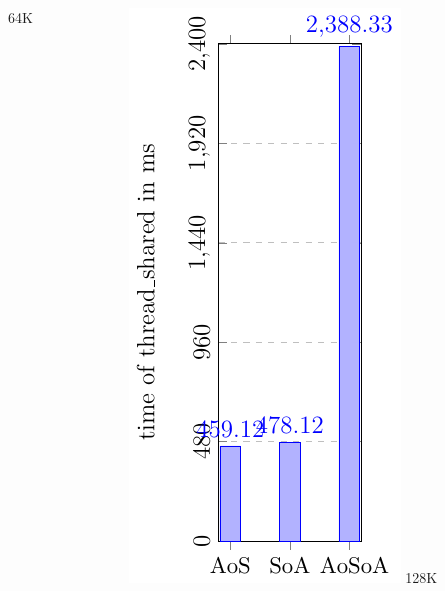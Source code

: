 \documentclass[aspectratio=169]{beamer}
\begin{document}
\begin{frame}
\begin{columns}
\begin{column}{0.25\textwidth}
	\small 64K
	\end{column}
	\begin{column}{0.25\textwidth}
	\includegraphics[scale=0.55]{figures/fig4.pdf}
	\small 128K
	\end{column}	
	\end{columns}
	
\end{frame}
\end{document}
